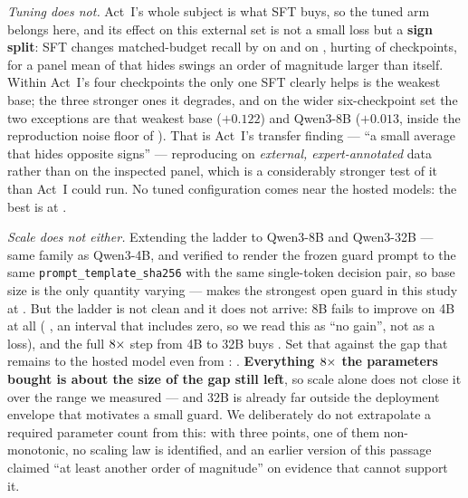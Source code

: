 \documentclass[11pt]{article}
\newcommand{\code}[1]{\texttt{\small #1}}
\begin{document}
\emph{Tuning does not.} Act~I's whole subject is what SFT buys, so the tuned arm belongs
here, and its effect on this external set is not a small loss but a \textbf{sign split}:
SFT changes matched-budget recall by \FrontierSftBestDelta{} on \FrontierSftBestName{} and
\FrontierSftWorstDelta{} on \FrontierSftWorstName, hurting \FrontierSftNumHurt{} of
\FrontierSftNumTotal{} checkpoints, for a panel mean of \FrontierSftMeanDelta{} that hides
swings an order of magnitude larger than itself. Within Act~I's four checkpoints the only one
SFT clearly helps is the weakest base; the three stronger ones it degrades, and on the wider
six-checkpoint set the two exceptions are that weakest base ($+0.122$) and Qwen3-8B ($+0.013$,
inside the reproduction noise floor of ). That is Act~I's transfer
finding --- ``a small average that hides opposite signs'' --- reproducing on \emph{external,
expert-annotated} data rather than on the inspected panel, which is a considerably stronger
test of it than Act~I could run. No tuned configuration comes near the hosted models: the
best is \FrontierBestSftName{} at \FrontierBestSftTpr.

\emph{Scale does not either.} Extending the ladder to Qwen3-8B and Qwen3-32B --- same family
as Qwen3-4B, and verified to render the frozen guard prompt to the same
\code{prompt\_template\_sha256} with the same single-token decision pair, so base size is the
only quantity varying --- makes \FrontierBestOpenName{} the strongest open guard in this study
at \FrontierBestOpenTpr. But the ladder is not clean and it does not arrive: 8B fails to
improve on 4B at all (\FrontierEightBvsFourB{} \FrontierEightBvsFourBCI, an interval that
includes zero, so we read this as ``no gain'', not as a loss), and the full
$8\times$ step from 4B to 32B buys \FrontierScaleGain{}
\FrontierScaleGainCI. Set that against the gap that remains to the hosted model even from
\FrontierBestOpenName: \FrontierGainOverOpen{} \FrontierGainOverOpenCI. \textbf{Everything
$8\times$ the parameters bought is about the size of the gap still left},
so scale alone does not close it over the range we measured --- and 32B is already far outside
the deployment envelope that motivates a small guard. We deliberately do not extrapolate a
required parameter count from this: with three points, one of them non-monotonic, no scaling
law is identified, and an earlier version of this passage claimed ``at least another order of
magnitude'' on evidence that cannot support it.
\end{document}
